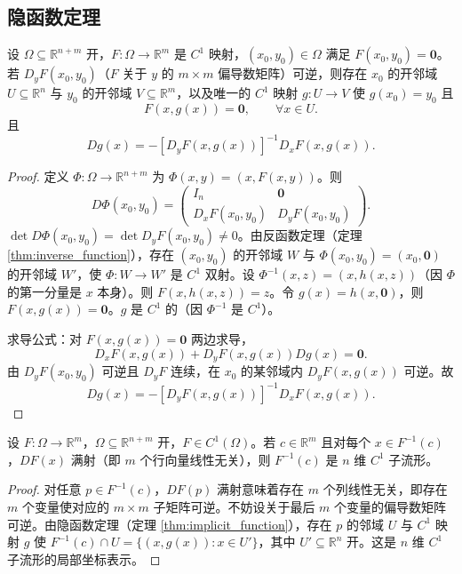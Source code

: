 \subsection{隐函数定理}

\begin{theorem}[隐函数定理]\label{thm:implicit_function}
设 $\Omega \subseteq \mathbb{R}^{n+m}$ 开，$F: \Omega \to \mathbb{R}^m$ 是 $C^1$ 映射，$(x_0, y_0) \in \Omega$ 满足 $F(x_0, y_0) = \mathbf{0}$。若 $D_y F(x_0, y_0)$（$F$ 关于 $y$ 的 $m \times m$ 偏导数矩阵）可逆，则存在 $x_0$ 的开邻域 $U \subseteq \mathbb{R}^n$ 与 $y_0$ 的开邻域 $V \subseteq \mathbb{R}^m$，以及唯一的 $C^1$ 映射 $g: U \to V$ 使 $g(x_0) = y_0$ 且
\[
F(x, g(x)) = \mathbf{0}, \qquad \forall x \in U.
\]
且
\[
Dg(x) = -[D_y F(x, g(x))]^{-1} D_x F(x, g(x)).
\]
\end{theorem}

\begin{proof}
定义 $\Phi: \Omega \to \mathbb{R}^{n+m}$ 为 $\Phi(x, y) = (x, F(x, y))$。则
\[
D\Phi(x_0, y_0) = \begin{pmatrix} I_n & \mathbf{0} \\ D_x F(x_0, y_0) & D_y F(x_0, y_0) \end{pmatrix}.
\]
$\det D\Phi(x_0, y_0) = \det D_y F(x_0, y_0) \neq 0$。由反函数定理（定理 \ref{thm:inverse_function}），存在 $(x_0, y_0)$ 的开邻域 $W$ 与 $\Phi(x_0, y_0) = (x_0, \mathbf{0})$ 的开邻域 $W'$，使 $\Phi: W \to W'$ 是 $C^1$ 双射。设 $\Phi^{-1}(x, z) = (x, h(x, z))$（因 $\Phi$ 的第一分量是 $x$ 本身）。则 $F(x, h(x, z)) = z$。令 $g(x) = h(x, \mathbf{0})$，则 $F(x, g(x)) = \mathbf{0}$。$g$ 是 $C^1$ 的（因 $\Phi^{-1}$ 是 $C^1$）。

求导公式：对 $F(x, g(x)) = \mathbf{0}$ 两边求导，
\[
D_x F(x, g(x)) + D_y F(x, g(x)) Dg(x) = \mathbf{0}.
\]
由 $D_y F(x_0, y_0)$ 可逆且 $D_y F$ 连续，在 $x_0$ 的某邻域内 $D_y F(x, g(x))$ 可逆。故
\[
Dg(x) = -[D_y F(x, g(x))]^{-1} D_x F(x, g(x)).
\]
\end{proof}

\begin{corollary}[正则水平集是子流形]\label{cor:regular_level_set_ra}
设 $F: \Omega \to \mathbb{R}^m$，$\Omega \subseteq \mathbb{R}^{n+m}$ 开，$F \in C^1(\Omega)$。若 $c \in \mathbb{R}^m$ 且对每个 $x \in F^{-1}(c)$，$DF(x)$ 满射（即 $m$ 个行向量线性无关），则 $F^{-1}(c)$ 是 $n$ 维 $C^1$ 子流形。
\end{corollary}

\begin{proof}
对任意 $p \in F^{-1}(c)$，$DF(p)$ 满射意味着存在 $m$ 个列线性无关，即存在 $m$ 个变量使对应的 $m \times m$ 子矩阵可逆。不妨设关于最后 $m$ 个变量的偏导数矩阵可逆。由隐函数定理（定理 \ref{thm:implicit_function}），存在 $p$ 的邻域 $U$ 与 $C^1$ 映射 $g$ 使 $F^{-1}(c) \cap U = \{(x, g(x)) : x \in U'\}$，其中 $U' \subseteq \mathbb{R}^n$ 开。这是 $n$ 维 $C^1$ 子流形的局部坐标表示。
\end{proof}

